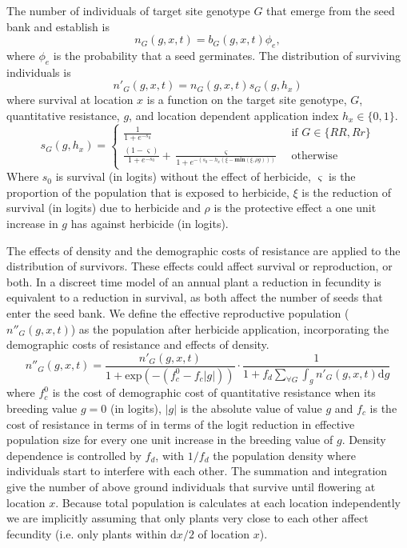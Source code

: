 \documentclass[10pt,letterpaper]{article}
\begin{document}
The number of individuals of target site genotype $G$ that emerge from the seed bank and establish is 
\begin{equation}\label{eq:above_ground}
	n_G(g, x, t) = b_G(g, x, t)\phi_e,
\end{equation}
where $\phi_e$ is the probability that a seed germinates. The distribution of surviving individuals is 
\begin{equation}\label{eq:abg_sur}
	n'_G(g, x, t) = n_G(g, x, t)s_G(g, h_x) 
\end{equation}
where survival at location $x$ is a function on the target site genotype, $G$, quantitative resistance, $g$, and location dependent application index $h_x \in \{0, 1\}$.   
\begin{equation}\label{eq:sur_G}
	s_G(g, h_x) = \begin{cases} 
		\frac{1}{1 + e^{-s_0}} &\text{~if~} G \in \{RR, Rr\} \\
		\frac{(1 - \varsigma)}{1 + e^{-s_0}} + \frac{\varsigma}{1 + e^{-\left(s_0 - h_x\left(\xi - \textbf{min}(\xi, \rho g) \right)\right)}} &\text{~otherwise~} 		
	\end{cases} 
\end{equation}  
Where $s_0$ is survival (in logits) without the effect of herbicide, $\varsigma$ is the proportion of the population that is exposed to herbicide, $\xi$ is the reduction of survival (in logits) due to herbicide and $\rho$ is the protective effect a one unit increase in $g$ has against herbicide (in logits).   

The effects of density and the demographic costs of resistance are applied to the distribution of survivors. These effects could affect survival or reproduction, or both. In a discreet time model of an annual plant a reduction in fecundity is equivalent to a reduction in survival, as both affect the number of seeds that enter the seed bank. We define the effective reproductive population ($n''_G(g, x, t)$) as the population after herbicide application, incorporating the demographic costs of resistance and effects of density. 
\begin{equation}\label{eq:effect_pop}
	n''_G(g, x, t) = \frac{n'_G(g, x, t)}{1 + \text{exp}(-(f_c^0 - f_c|g|))}\cdot\frac{1}{1 + f_d\sum_{\forall G} \int_g n'_G(g, x, t)\text{d}g}
\end{equation} 
where $f_c^0$ is the cost of demographic cost of quantitative resistance when its breeding value $g = 0$ (in logits), $|g|$ is the absolute value of value $g$ and $f_c$ is the cost of resistance in terms of in terms of the logit reduction in effective population size for every one unit increase in the breeding value of $g$. Density dependence is controlled by $f_d$, with $1/f_d$ the population density where individuals start to interfere with each other. The summation and integration give the number of above ground individuals that survive until flowering at location $x$. Because total population is calculates at each location independently we are implicitly assuming that only plants very close to each other affect fecundity (i.e. only plants within $\text{d}x / 2$ of location $x$). 
\end{document}
